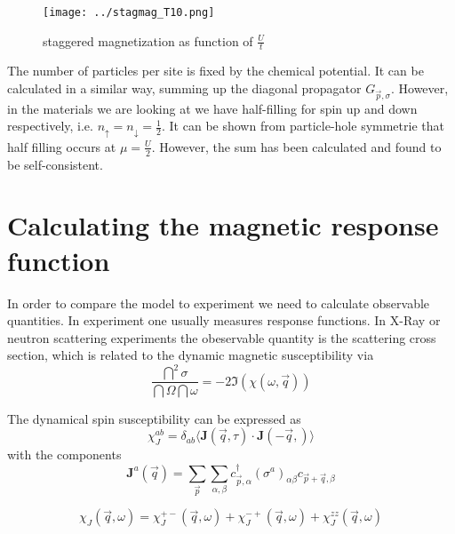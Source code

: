 \documentclass[a4paper,10pt]{report}
\begin{document}
\begin{figure}
 \label{ms_nn}
 \texttt{[image: ../stagmag\_T10.png]}
 \caption{staggered magnetization as function of $\frac Ut$}
 
\end{figure}

The number of particles per site is fixed by the chemical potential. It can be calculated in a similar way, summing up the diagonal propagator $G_{\vec{p}, \sigma}$. 
However, in the materials we are looking at we have half-filling for spin up and down respectively, i.e. $n_{\uparrow}=n_{\downarrow}=\frac12$.
It can be shown from particle-hole symmetrie that half filling occurs at $\mu=\frac U2$.
However, the sum has been calculated and found to be self-consistent.

\section{Calculating the magnetic response function}

In order to compare the model to experiment we need to calculate observable quantities.
In experiment one usually measures response functions. 
In X-Ray or neutron scattering experiments the obeservable quantity is the scattering cross section, which is related to the dynamic magnetic susceptibility via
\begin{equation}
\frac{\dint^2 \sigma}{\dint \Omega \dint \omega} = -2\Im \left(\chi(\omega,\vec q)\right)
\end{equation}


The dynamical spin susceptibility can be expressed as
\begin{equation}
 \chi_{J}^{ab} = \delta_{ab} \langle \mathbf{J}(\vec q,\tau)\cdot \mathbf{J}(-\vec q,) \rangle
\end{equation}
with the components 
\begin{equation}
\mathbf{ J}^{a}(\vec q) = \sum_{\vec p} \sum_{\alpha,\beta} c^{\dagger}_{\vec p ,\alpha} \left(\sigma^a \right)_{\alpha\beta} c_{\vec p+\vec q,\beta}
\end{equation}



\begin{equation}
 \chi_J(\vec q,\omega)  = \chi_J^{+-}(\vec q,\omega) + \chi_J^{-+}(\vec q,\omega) + \chi_J^{zz}(\vec q,\omega)
\end{equation}
\end{document}
